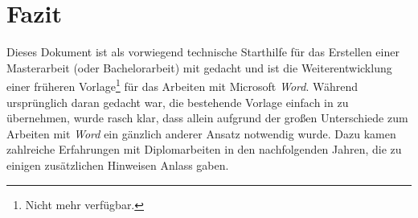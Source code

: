 \chapter{Fazit}
Dieses Dokument ist als vorwiegend technische Starthilfe für das
Erstellen einer Masterarbeit (oder Bachelorarbeit) mit \latex
gedacht und ist die Weiterentwicklung einer früheren
Vorlage\footnote{Nicht mehr verfügbar.} für das Arbeiten mit
Microsoft \emph{Word}. Während ursprünglich daran gedacht war, die
bestehende Vorlage einfach in \latex zu übernehmen, wurde rasch
klar, dass allein aufgrund der großen Unterschiede zum Arbeiten
mit \emph{Word} ein gänzlich anderer Ansatz notwendig wurde. Dazu
kamen zahlreiche Erfahrungen mit Diplomarbeiten in den
nachfolgenden Jahren, die zu einigen zusätzlichen Hinweisen Anlass gaben.
